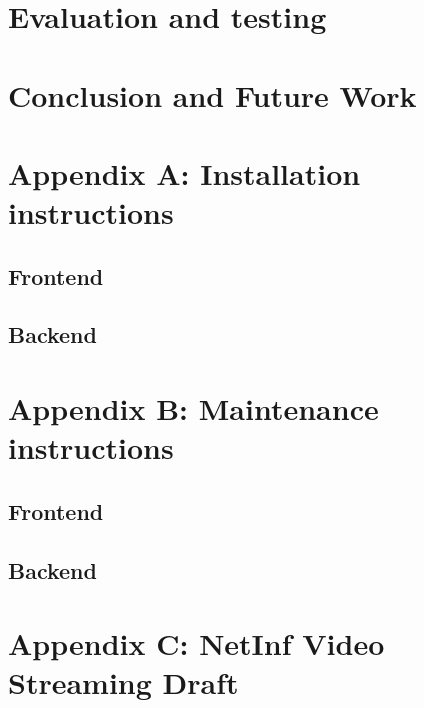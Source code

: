 \documentclass[11pt]{report}
\begin{document}






\chapter{Evaluation and testing}



\chapter{Conclusion and Future Work}


\chapter{Appendix A: Installation instructions}
\section {Frontend}

\section {Backend}

\chapter {Appendix B: Maintenance instructions}

\section{Frontend}

\section{Backend}

\chapter {Appendix C: NetInf Video Streaming Draft}

\end{document}
